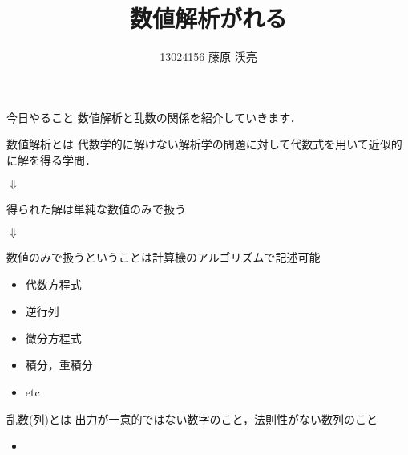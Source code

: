 \documentclass[a4j,dvipdfmx]{beamer}
\title{数値解析が\jruby{乱数}{み|だ}れる}
\author{13024156 藤原 渓亮}
\begin{document}
  \maketitle
  \begin{frame}{今日やること}
    数値解析と乱数の関係を紹介していきます．
  \end{frame}
  \begin{frame}{数値解析とは}
    代数学的に解けない解析学の問題に対して代数式を用いて近似的に解を得る学問．
    \begin{center}$\Downarrow$\end{center}
    得られた解は単純な数値のみで扱う
    \begin{center}$\Downarrow$\end{center}
    数値のみで扱うということは計算機のアルゴリズムで記述可能
  \end{frame}
  \begin{frame}
    \begin{itemize}
      \item 代数方程式
      \item 逆行列
      \item 微分方程式
      \item 積分，重積分
      \item etc
    \end{itemize}

  \end{frame}
  \begin{frame}{乱数(列)とは}
    出力が一意的ではない数字のこと，法則性がない数列のこと
    \begin{itemize}
      \item
    \end{itemize}
  \end{frame}
\end{document}
